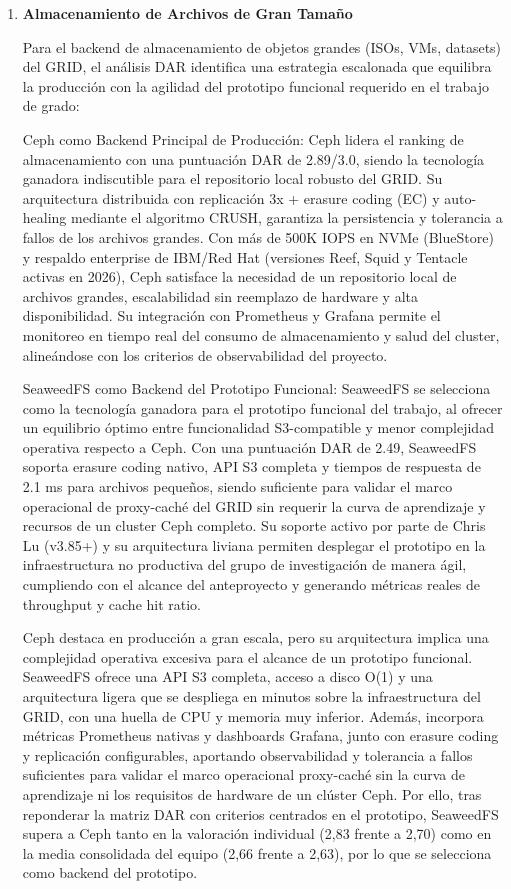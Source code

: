 \begin{enumerate}[label=\textbf{\arabic*.}, leftmargin=*, itemsep=0.9em]
  \item \textbf{Almacenamiento de Archivos de Gran Tamaño}

  Para el backend de almacenamiento de objetos grandes (ISOs, VMs, datasets) del GRID, el análisis DAR identifica una estrategia escalonada que equilibra la producción con la agilidad del prototipo funcional requerido en el trabajo de grado:

  Ceph como Backend Principal de Producción: Ceph lidera el ranking de almacenamiento con una puntuación DAR de 2.89/3.0, siendo la tecnología ganadora indiscutible para el repositorio local robusto del GRID. Su arquitectura distribuida con replicación 3x + erasure coding (EC) y auto-healing mediante el algoritmo CRUSH, garantiza la persistencia y tolerancia a fallos de los archivos grandes. Con más de 500K IOPS en NVMe (BlueStore) y respaldo enterprise de IBM/Red Hat (versiones Reef, Squid y Tentacle activas en 2026), Ceph satisface la necesidad de un repositorio local de archivos grandes, escalabilidad sin reemplazo de hardware y alta disponibilidad. Su integración con Prometheus y Grafana permite el monitoreo en tiempo real del consumo de almacenamiento y salud del cluster, alineándose con los criterios de observabilidad del proyecto.

  SeaweedFS como Backend del Prototipo Funcional: SeaweedFS se selecciona como la tecnología ganadora para el prototipo funcional del trabajo, al ofrecer un equilibrio óptimo entre funcionalidad S3-compatible y menor complejidad operativa respecto a Ceph. Con una puntuación DAR de 2.49, SeaweedFS soporta erasure coding nativo, API S3 completa y tiempos de respuesta de 2.1 ms para archivos pequeños, siendo suficiente para validar el marco operacional de proxy-caché del GRID sin requerir la curva de aprendizaje y recursos de un cluster Ceph completo. Su soporte activo por parte de Chris Lu (v3.85+) y su arquitectura liviana permiten desplegar el prototipo en la infraestructura no productiva del grupo de investigación de manera ágil, cumpliendo con el alcance del anteproyecto y generando métricas reales de throughput y cache hit ratio.

  Ceph destaca en producción a gran escala, pero su arquitectura implica una complejidad operativa excesiva para el alcance de un prototipo funcional. SeaweedFS ofrece una API S3 completa, acceso a disco O(1) y una arquitectura ligera que se despliega en minutos sobre la infraestructura del GRID, con una huella de CPU y memoria muy inferior. Además, incorpora métricas Prometheus nativas y dashboards Grafana, junto con erasure coding y replicación configurables, aportando observabilidad y tolerancia a fallos suficientes para validar el marco operacional proxy-caché sin la curva de aprendizaje ni los requisitos de hardware de un clúster Ceph. Por ello, tras reponderar la matriz DAR con criterios centrados en el prototipo, SeaweedFS supera a Ceph tanto en la valoración individual (2,83 frente a 2,70) como en la media consolidada del equipo (2,66 frente a 2,63), por lo que se selecciona como backend del prototipo.

\end{enumerate}
